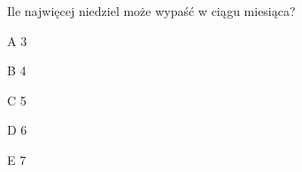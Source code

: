 \begin{tresc}
Ile najwięcej niedziel może wypaść w ciągu miesiąca?
\end{tresc}
\begin{wariant}{A} 3 \end{wariant}
\begin{wariant}{B} 4 \end{wariant}
\begin{wariant}{C} 5 \end{wariant}
\begin{wariant}{D} 6 \end{wariant}
\begin{wariant}{E} 7 \end{wariant}
